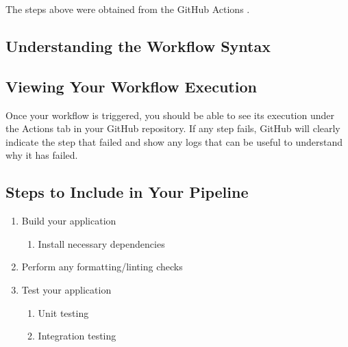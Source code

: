 \documentclass[letterpaper,10pt,english]{jupyterBook}
\begin{document}
\sphinxAtStartPar
The steps above were obtained from the GitHub Actions
.


\subsection{Understanding the Workflow Syntax}
\label{\detokenize{chapter_12/ci_cd:understanding-the-workflow-syntax}}
\sphinxAtStartPar
{}


\subsection{Viewing Your Workflow Execution}
\label{\detokenize{chapter_12/ci_cd:viewing-your-workflow-execution}}
\sphinxAtStartPar
Once your workflow is triggered, you should be able to see its execution
under the Actions tab in your GitHub repository. If any step fails,
GitHub will clearly indicate the step that failed and show any logs that
can be useful to understand why it has failed.


\subsection{Steps to Include in Your Pipeline}
\label{\detokenize{chapter_12/ci_cd:steps-to-include-in-your-pipeline}}\begin{enumerate}
%
\item {} 
\sphinxAtStartPar
Build your application
\begin{enumerate}
%
\item {} 
\sphinxAtStartPar
Install necessary dependencies

\end{enumerate}

\item {} 
\sphinxAtStartPar
Perform any formatting/linting checks

\item {} 
\sphinxAtStartPar
Test your application
\begin{enumerate}
%
\item {} 
\sphinxAtStartPar
Unit testing

\item {} 
\sphinxAtStartPar
Integration testing

\end{enumerate}

\end{enumerate}
\end{document}
